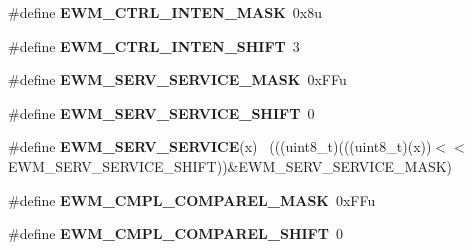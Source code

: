 \begin{DoxyCompactItemize}
\item 
\hypertarget{group___e_w_m___register___masks_gab5aba63161ed0c5524fff6007d84f06b}{}\#define {\bfseries E\+W\+M\+\_\+\+C\+T\+R\+L\+\_\+\+I\+N\+T\+E\+N\+\_\+\+M\+A\+S\+K}~0x8u\label{group___e_w_m___register___masks_gab5aba63161ed0c5524fff6007d84f06b}

\item 
\hypertarget{group___e_w_m___register___masks_gae89666da54b9dba35d0ac6e74542413d}{}\#define {\bfseries E\+W\+M\+\_\+\+C\+T\+R\+L\+\_\+\+I\+N\+T\+E\+N\+\_\+\+S\+H\+I\+F\+T}~3\label{group___e_w_m___register___masks_gae89666da54b9dba35d0ac6e74542413d}

\item 
\hypertarget{group___e_w_m___register___masks_ga45e5d6d64deeb807800e044bb82f318f}{}\#define {\bfseries E\+W\+M\+\_\+\+S\+E\+R\+V\+\_\+\+S\+E\+R\+V\+I\+C\+E\+\_\+\+M\+A\+S\+K}~0x\+F\+Fu\label{group___e_w_m___register___masks_ga45e5d6d64deeb807800e044bb82f318f}

\item 
\hypertarget{group___e_w_m___register___masks_ga4aacdb92f0d1a2edcdf651328e741c6a}{}\#define {\bfseries E\+W\+M\+\_\+\+S\+E\+R\+V\+\_\+\+S\+E\+R\+V\+I\+C\+E\+\_\+\+S\+H\+I\+F\+T}~0\label{group___e_w_m___register___masks_ga4aacdb92f0d1a2edcdf651328e741c6a}

\item 
\hypertarget{group___e_w_m___register___masks_gaf5f891da276df3d0ec104c6aa126540e}{}\#define {\bfseries E\+W\+M\+\_\+\+S\+E\+R\+V\+\_\+\+S\+E\+R\+V\+I\+C\+E}(x)                                        ~(((uint8\+\_\+t)(((uint8\+\_\+t)(x))$<$$<$E\+W\+M\+\_\+\+S\+E\+R\+V\+\_\+\+S\+E\+R\+V\+I\+C\+E\+\_\+\+S\+H\+I\+F\+T))\&E\+W\+M\+\_\+\+S\+E\+R\+V\+\_\+\+S\+E\+R\+V\+I\+C\+E\+\_\+\+M\+A\+S\+K)\label{group___e_w_m___register___masks_gaf5f891da276df3d0ec104c6aa126540e}

\item 
\hypertarget{group___e_w_m___register___masks_gaed4764277fd6da7338abe074b6ca509e}{}\#define {\bfseries E\+W\+M\+\_\+\+C\+M\+P\+L\+\_\+\+C\+O\+M\+P\+A\+R\+E\+L\+\_\+\+M\+A\+S\+K}~0x\+F\+Fu\label{group___e_w_m___register___masks_gaed4764277fd6da7338abe074b6ca509e}

\item 
\hypertarget{group___e_w_m___register___masks_ga34ba2acd3dfb6ac825d6ca812b4461fd}{}\#define {\bfseries E\+W\+M\+\_\+\+C\+M\+P\+L\+\_\+\+C\+O\+M\+P\+A\+R\+E\+L\+\_\+\+S\+H\+I\+F\+T}~0\label{group___e_w_m___register___masks_ga34ba2acd3dfb6ac825d6ca812b4461fd}


\end{DoxyCompactItemize}

